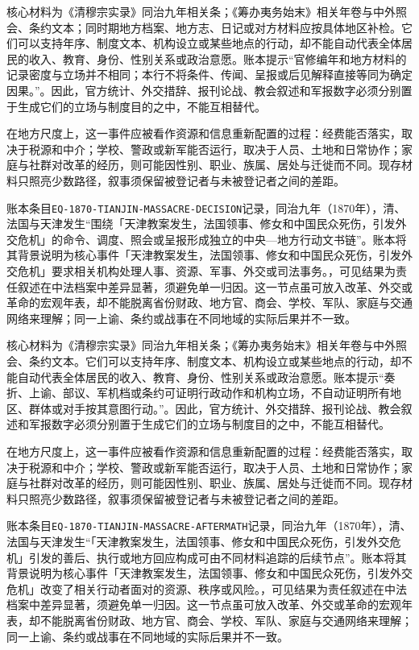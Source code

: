 核心材料为《清穆宗实录》同治九年相关条；《筹办夷务始末》相关年卷与中外照会、条约文本；同时期地方档案、地方志、日记或对方材料应按具体地区补检。它们可以支持年序、制度文本、机构设立或某些地点的行动，却不能自动代表全体居民的收入、教育、身份、性别关系或政治意愿。账本提示“官修编年和地方材料的记录密度与立场并不相同；本行不将条件、传闻、呈报或后见解释直接等同为确定因果。”。因此，官方统计、外交措辞、报刊论战、教会叙述和军报数字必须分别置于生成它们的立场与制度目的之中，不能互相替代。

在地方尺度上，这一事件应被看作资源和信息重新配置的过程：经费能否落实，取决于税源和中介；学校、警政或新军能否运行，取决于人员、土地和日常协作；家庭与社群对改革的经历，则可能因性别、职业、族属、居处与迁徙而不同。现存材料只照亮少数路径，叙事须保留被登记者与未被登记者之间的差距。

账本条目\texttt{EQ-1870-TIANJIN-MASSACRE-DECISION}记录，同治九年（1870年），清、法国与天津发生“围绕「天津教案发生，法国领事、修女和中国民众死伤，引发外交危机」的命令、调度、照会或呈报形成独立的中央—地方行动文书链”。账本将其背景说明为核心事件「天津教案发生，法国领事、修女和中国民众死伤，引发外交危机」要求相关机构处理人事、资源、军事、外交或司法事务。，可见结果为责任叙述在中法档案中差异显著，须避免单一归因。这一节点虽可放入改革、外交或革命的宏观年表，却不能脱离省份财政、地方官、商会、学校、军队、家庭与交通网络来理解；同一上谕、条约或战事在不同地域的实际后果并不一致。

核心材料为《清穆宗实录》同治九年相关条；《筹办夷务始末》相关年卷与中外照会、条约文本。它们可以支持年序、制度文本、机构设立或某些地点的行动，却不能自动代表全体居民的收入、教育、身份、性别关系或政治意愿。账本提示“奏折、上谕、部议、军机档或条约可证明行政动作和机构立场，不自动证明所有地区、群体或对手按其意图行动。”。因此，官方统计、外交措辞、报刊论战、教会叙述和军报数字必须分别置于生成它们的立场与制度目的之中，不能互相替代。

在地方尺度上，这一事件应被看作资源和信息重新配置的过程：经费能否落实，取决于税源和中介；学校、警政或新军能否运行，取决于人员、土地和日常协作；家庭与社群对改革的经历，则可能因性别、职业、族属、居处与迁徙而不同。现存材料只照亮少数路径，叙事须保留被登记者与未被登记者之间的差距。

账本条目\texttt{EQ-1870-TIANJIN-MASSACRE-AFTERMATH}记录，同治九年（1870年），清、法国与天津发生“「天津教案发生，法国领事、修女和中国民众死伤，引发外交危机」引发的善后、执行或地方回应构成可由不同材料追踪的后续节点”。账本将其背景说明为核心事件「天津教案发生，法国领事、修女和中国民众死伤，引发外交危机」改变了相关行动者面对的资源、秩序或风险。，可见结果为责任叙述在中法档案中差异显著，须避免单一归因。这一节点虽可放入改革、外交或革命的宏观年表，却不能脱离省份财政、地方官、商会、学校、军队、家庭与交通网络来理解；同一上谕、条约或战事在不同地域的实际后果并不一致。

